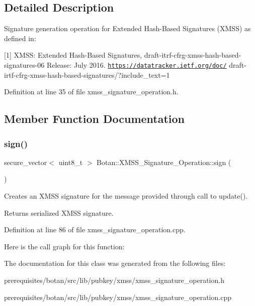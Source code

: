 \subsection{Detailed Description}
Signature generation operation for Extended Hash-\/\+Based Signatures (X\+M\+SS) as defined in\+:

\mbox{[}1\mbox{]} X\+M\+SS\+: Extended Hash-\/\+Based Signatures, draft-\/itrf-\/cfrg-\/xmss-\/hash-\/based-\/signatures-\/06 Release\+: July 2016. \href{https://datatracker.ietf.org/doc/}{\tt https\+://datatracker.\+ietf.\+org/doc/} draft-\/irtf-\/cfrg-\/xmss-\/hash-\/based-\/signatures/?include\+\_\+text=1 

Definition at line 35 of file xmss\+\_\+signature\+\_\+operation.\+h.



\subsection{Member Function Documentation}
\mbox{\label{class_botan_1_1_x_m_s_s___signature___operation_a358b62ab358d6d82ba3576821965983d}} 
\subsubsection{\texorpdfstring{sign()}{sign()}}
{\footnotesize\ttfamily secure\+\_\+vector$<$ uint8\+\_\+t $>$ Botan\+::\+X\+M\+S\+S\+\_\+\+Signature\+\_\+\+Operation\+::sign (\begin{DoxyParamCaption}\item[{Random\+Number\+Generator \&}]{ }\end{DoxyParamCaption})\hspace{0.3cm}{\ttfamily [override]}}

Creates an X\+M\+SS signature for the message provided through call to update().

\begin{DoxyReturn}{Returns}
serialized X\+M\+SS signature. 
\end{DoxyReturn}


Definition at line 86 of file xmss\+\_\+signature\+\_\+operation.\+cpp.

Here is the call graph for this function\+:


The documentation for this class was generated from the following files\+:\begin{DoxyCompactItemize}
\item 
prerequisites/botan/src/lib/pubkey/xmss/xmss\+\_\+signature\+\_\+operation.\+h\item 
prerequisites/botan/src/lib/pubkey/xmss/xmss\+\_\+signature\+\_\+operation.\+cpp\end{DoxyCompactItemize}
